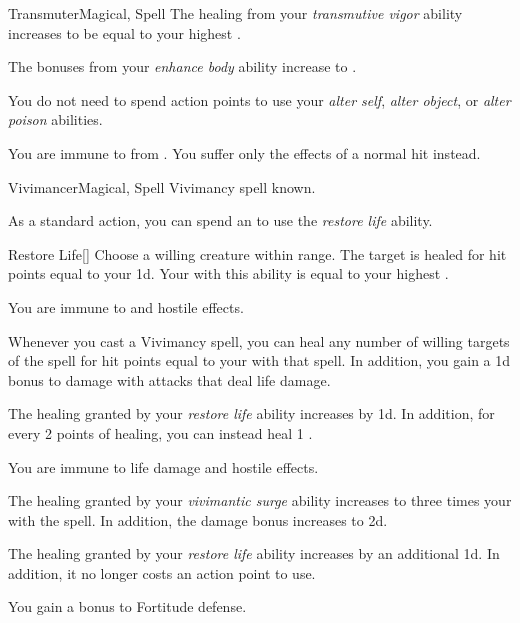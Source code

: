 \begin{feat}{Transmuter}{Magical, Spell}
         The healing from your \textit{transmutive vigor} ability increases to be equal to your highest .

         The bonuses from your \textit{enhance body} ability increase to .

         You do not need to spend action points to use your \textit{alter self}, \textit{alter object}, or \textit{alter poison} abilities.

         You are immune to  from .
        You suffer only the effects of a normal hit instead.
    \end{feat}

    \begin{feat}{Vivimancer}{Magical, Spell}
        \featpre Vivimancy spell known.

         As a standard action, you can spend an  to use the \textit{restore life} ability.
        \begin{ability}{Restore Life}[]
            Choose a willing creature within \rngmed range.
            The target is healed for hit points equal to your  \plus1d.
            Your  with this ability is equal to your highest .
        \end{ability}

         You are immune to  and hostile  effects.

         Whenever you cast a Vivimancy spell, you can heal any number of willing targets of the spell for hit points equal to your  with that spell.
        In addition, you gain a \plus1d bonus to damage with attacks that deal life damage.

         The healing granted by your \textit{restore life} ability increases by \plus1d.
        In addition, for every 2 points of healing, you can instead heal 1 .

         You are immune to life damage and hostile  effects.

         The healing granted by your \textit{vivimantic surge} ability increases to three times your  with the spell.
        In addition, the damage bonus increases to \plus2d.

         The healing granted by your \textit{restore life} ability increases by an additional \plus1d.
        In addition, it no longer costs an action point to use.

         You gain a  bonus to Fortitude defense.
    \end{feat}

